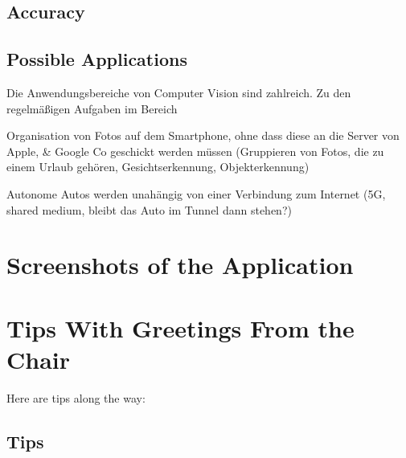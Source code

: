 \documentclass[
			   fontsize=11pt,
               paper=a4,
               bibliography=totoc,
               idxtotoc,
               headsepline,
               footsepline,
               footinclude=false,
               BCOR=12mm,
               DIV=13,
               openany,   %
               ]
               {scrbook}
\begin{document}
\section{Accuracy}

\section{Possible Applications} %

Die Anwendungsbereiche von Computer Vision sind zahlreich. Zu den regelmäßigen Aufgaben im Bereich 

Organisation von Fotos auf dem Smartphone, ohne dass diese an die Server von Apple, \& Google Co geschickt werden müssen (Gruppieren von Fotos, die zu einem Urlaub gehören, Gesichtserkennung, Objekterkennung)

Autonome Autos werden unahängig von einer Verbindung zum Internet (5G, shared medium, bleibt das Auto im Tunnel dann stehen?)





\appendix

\chapter{Screenshots of the Application}

\chapter{Tips With Greetings From the Chair}
\label{sec:tips}       %
Here are tips along the way:

\section{Tips}
\end{document}
